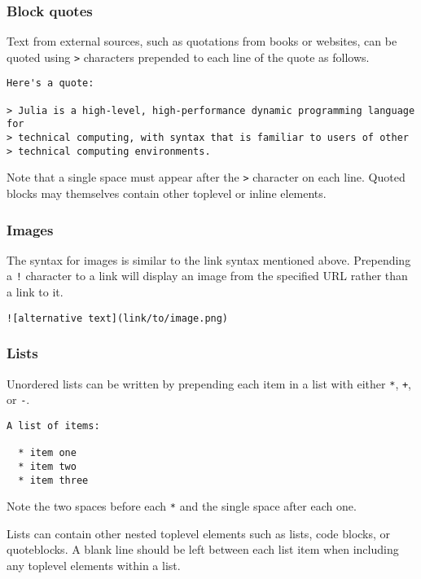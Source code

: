\subsubsection{Block quotes}
Text from external sources, such as quotations from books or websites, can be quoted using \texttt{>} characters prepended to each line of the quote as follows.

\begin{verbatim}
Here's a quote:

> Julia is a high-level, high-performance dynamic programming language for
> technical computing, with syntax that is familiar to users of other
> technical computing environments.
\end{verbatim}
Note that a single space must appear after the \texttt{>} character on each line. Quoted blocks may themselves contain other toplevel or inline elements.

\subsubsection{Images}
The syntax for images is similar to the link syntax mentioned above. Prepending a \texttt{!} character to a link will display an image from the specified URL rather than a link to it.

\begin{verbatim}
![alternative text](link/to/image.png)
\end{verbatim}
\subsubsection{Lists}
Unordered lists can be written by prepending each item in a list with either \texttt{*}, \texttt{+}, or \texttt{-}.

\begin{verbatim}
A list of items:

  * item one
  * item two
  * item three
\end{verbatim}
Note the two spaces before each \texttt{*} and the single space after each one.

Lists can contain other nested toplevel elements such as lists, code blocks, or quoteblocks. A blank line should be left between each list item when including any toplevel elements within a list.

